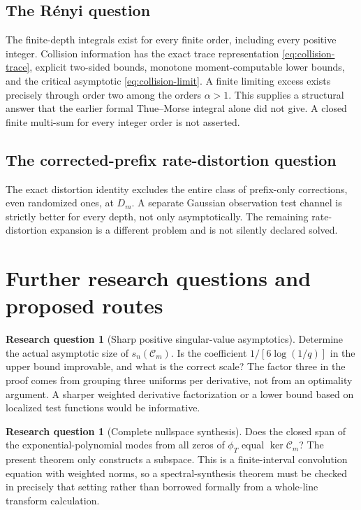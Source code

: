 \documentclass[11pt,a4paper]{article}
\numberwithin{equation}{section}
\theoremstyle{definition}\newtheorem{definition}[theorem]{Definition}
\newtheorem{problem}[theorem]{Research question}
\theoremstyle{remark}\newtheorem{remark}[theorem]{Remark}
\newcommand{\calC}{\mathcal C_m}\newcommand{\calP}{\mathcal P}
\begin{document}
\subsection{The R\'enyi question}
The finite-depth integrals exist for every finite order, including every positive integer. Collision information has the exact trace representation \eqref{eq:collision-trace}, explicit two-sided bounds, monotone moment-computable lower bounds, and the critical asymptotic \eqref{eq:collision-limit}. A finite limiting excess exists precisely through order two among the orders $\alpha>1$. This supplies a structural answer that the earlier formal Thue--Morse integral alone did not give. A closed finite multi-sum for every integer order is not asserted.

\subsection{The corrected-prefix rate-distortion question}
The exact distortion identity excludes the entire class of prefix-only corrections, even randomized ones, at $D_m$. A separate Gaussian observation test channel is strictly better for every depth, not only asymptotically. The remaining rate-distortion expansion is a different problem and is not silently declared solved.

\section{Further research questions and proposed routes}
\label{sec:future}
\begin{problem}[Sharp positive singular-value asymptotics]
Determine the actual asymptotic size of $s_n(\calC)$. Is the coefficient $1/[6\log(1/q)]$ in the upper bound improvable, and what is the correct scale? The factor three in the proof comes from grouping three uniforms per derivative, not from an optimality argument. A sharper weighted derivative factorization or a lower bound based on localized test functions would be informative.
\end{problem}

\begin{problem}[Complete nullspace synthesis]
Does the closed span of the exponential-polynomial modes from all zeros of $\phi_T$ equal $\ker\calC$? The present theorem only constructs a subspace. This is a finite-interval convolution equation with weighted norms, so a spectral-synthesis theorem must be checked in precisely that setting rather than borrowed formally from a whole-line transform calculation.
\end{problem}
\end{document}
